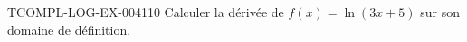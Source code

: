 \begin{exercice}{TCOMPL-LOG-EX-004}{1}{10}
Calculer la dérivée de $f(x) = \ln(3x+5)$ sur son domaine de définition.
\end{exercice}
